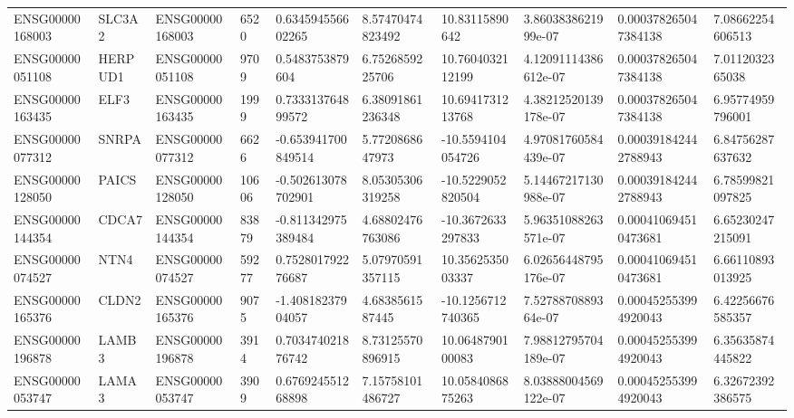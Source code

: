 \begin{tabular}{@{}llllllllll@{}}
ENSG00000168003 & SLC3A2 & ENSG00000168003 & 6520 & 0.634594556602265 & 8.57470474823492 & 10.83115890642 & 3.8603838621999e-07 & 0.000378265047384138 & 7.08662254606513 \\
ENSG00000051108 & HERPUD1 & ENSG00000051108 & 9709 & 0.5483753879604 & 6.7526859225706 & 10.7604032112199 & 4.12091114386612e-07 & 0.000378265047384138 & 7.0112032365038 \\
ENSG00000163435 & ELF3 & ENSG00000163435 & 1999 & 0.733313764899572 & 6.38091861236348 & 10.6941731213768 & 4.38212520139178e-07 & 0.000378265047384138 & 6.95774959796001 \\
ENSG00000077312 & SNRPA & ENSG00000077312 & 6626 & -0.653941700849514 & 5.7720868647973 & -10.5594104054726 & 4.97081760584439e-07 & 0.000391842442788943 & 6.84756287637632 \\
ENSG00000128050 & PAICS & ENSG00000128050 & 10606 & -0.502613078702901 & 8.05305306319258 & -10.5229052820504 & 5.14467217130988e-07 & 0.000391842442788943 & 6.78599821097825 \\
ENSG00000144354 & CDCA7 & ENSG00000144354 & 83879 & -0.811342975389484 & 4.68802476763086 & -10.3672633297833 & 5.96351088263571e-07 & 0.000410694510473681 & 6.65230247215091 \\
ENSG00000074527 & NTN4 & ENSG00000074527 & 59277 & 0.752801792276687 & 5.07970591357115 & 10.3562535003337 & 6.02656448795176e-07 & 0.000410694510473681 & 6.66110893013925 \\
ENSG00000165376 & CLDN2 & ENSG00000165376 & 9075 & -1.40818237904057 & 4.6838561587445 & -10.1256712740365 & 7.5278870889364e-07 & 0.000452553994920043 & 6.42256676585357 \\
ENSG00000196878 & LAMB3 & ENSG00000196878 & 3914 & 0.703474021876742 & 8.73125570896915 & 10.0648790100083 & 7.98812795704189e-07 & 0.000452553994920043 & 6.35635874445822 \\
ENSG00000053747 & LAMA3 & ENSG00000053747 & 3909 & 0.676924551268898 & 7.15758101486727 & 10.0584086875263 & 8.03888004569122e-07 & 0.000452553994920043 & 6.32672392386575 \\
\bottomrule
\end{tabular}
\endgroup
